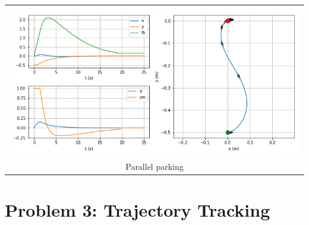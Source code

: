 \documentclass{article}
\begin{document}
\begin{enumerate}[label=(\roman*)]
	\begin{tabular}[t]{c}
		\hline \\
		\includegraphics[width=1.0\textwidth]{img/sim_parking_parallel.png} \\
		Parallel parking \\
		\hline
	\end{tabular}
		
	\end{enumerate}

\pagebreak

\section*{Problem 3: Trajectory Tracking}
\end{document}
